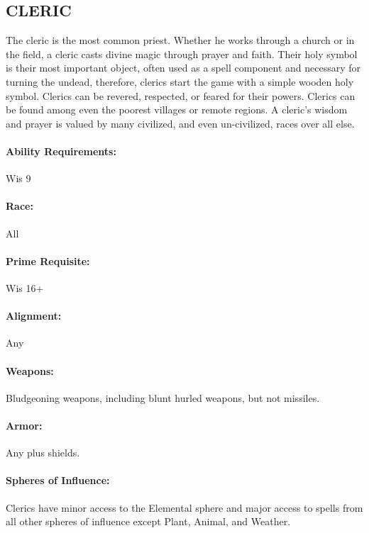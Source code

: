\begin{multicols}{2}

\subsection{CLERIC}

The cleric is the most common priest.  Whether he works through a church or in the field, a cleric casts divine magic through prayer and faith.  Their holy symbol is their most important object, often used as a spell component and necessary for turning the undead, therefore, clerics start the game with a simple wooden holy symbol. Clerics can be revered, respected, or feared for their powers.  Clerics can be found among even the poorest villages or remote regions.  A cleric's wisdom and prayer is valued by many civilized, and even un-civilized, races over all else.

\paragraph{Ability Requirements:} Wis 9

\paragraph{Race:} All

\paragraph{Prime Requisite:} Wis 16+

\paragraph{Alignment:} Any

\paragraph{Weapons:} Bludgeoning weapons, including blunt hurled weapons, but not missiles.

\paragraph{Armor:} Any plus shields.

\paragraph{Spheres of Influence:} Clerics have minor access to the Elemental sphere and major access to spells from all other spheres of influence except Plant, Animal, and Weather.  


\end{multicols}
